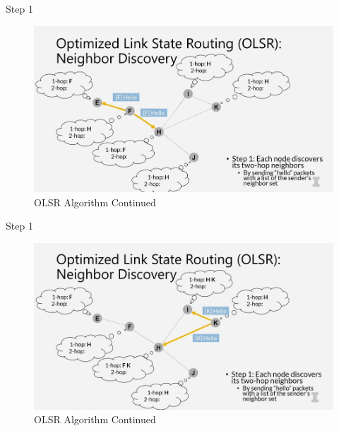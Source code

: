 \documentclass[11pt]{beamer}              %
\begin{document}
\begin{frame}{Step 1}

    \begin{figure}
        \centering
        \includegraphics[width=\textwidth]{figures/olsr3.png}
        \caption{OLSR Algorithm Continued \cite{coursera}}
    \end{figure}    
    
\end{frame}

\begin{frame}{Step 1}

    \begin{figure}
        \centering
        \includegraphics[width=\textwidth]{figures/olsr4.png}
        \caption{OLSR Algorithm Continued \cite{coursera}}
    \end{figure}    
    
\end{frame}
\end{document}

